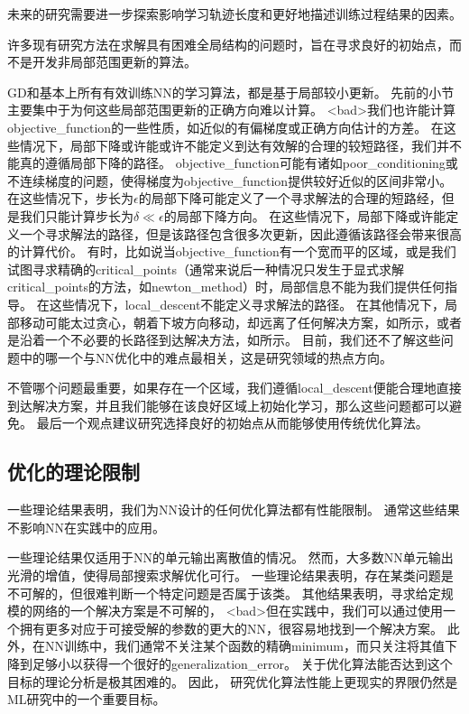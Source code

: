 未来的研究需要进一步探索影响学习轨迹长度和更好地描述训练过程结果的因素。

许多现有研究方法在求解具有困难全局结构的问题时，旨在寻求良好的初始点，而不是开发非局部范围更新的算法。


\gls{GD}和基本上所有有效训练\gls{NN}的学习算法，都是基于局部较小更新。
先前的小节主要集中于为何这些局部范围更新的正确方向难以计算。
<bad>我们也许能计算\gls{objective_function}的一些性质，如近似的有偏梯度或正确方向估计的方差。
在这些情况下，局部下降或许能或许不能定义到达有效解的合理的较短路径，我们并不能真的遵循局部下降的路径。
\gls{objective_function}可能有诸如\gls{poor_conditioning}或不连续梯度的问题，使得梯度为\gls{objective_function}提供较好近似的区间非常小。
在这些情况下，步长为$\epsilon$的局部下降可能定义了一个寻求解法的合理的短路经，但是我们只能计算步长为$\delta \ll \epsilon$的局部下降方向。
在这些情况下，局部下降或许能定义一个寻求解法的路径，但是该路径包含很多次更新，因此遵循该路径会带来很高的计算代价。
有时，比如说当\gls{objective_function}有一个宽而平的区域，或是我们试图寻求精确的\gls{critical_points}（通常来说后一种情况只发生于显式求解\gls{critical_points}的方法，如\gls{newton_method}）时，局部信息不能为我们提供任何指导。
在这些情况下，\gls{local_descent}不能定义寻求解法的路径。
在其他情况下，局部移动可能太过贪心，朝着下坡方向移动，却远离了任何解决方案，如所示，或者是沿着一个不必要的长路径到达解决方法，如所示。
目前，我们还不了解这些问题中的哪一个与\gls{NN}优化中的难点最相关，这是研究领域的热点方向。


不管哪个问题最重要，如果存在一个区域，我们遵循\gls{local_descent}便能合理地直接到达解决方案，并且我们能够在该良好区域上初始化学习，那么这些问题都可以避免。
最后一个观点建议研究选择良好的初始点从而能够使用传统优化算法。


\subsection{优化的理论限制}
\label{sec:theoretical_limits_of_optimization}
一些理论结果表明，我们为\gls{NN}设计的任何优化算法都有性能限制\citep{Blum92,JuddBook,wolpert96no}。
通常这些结果不影响\gls{NN}在实践中的应用。


一些理论结果仅适用于\gls{NN}的单元输出离散值的情况。
然而，大多数\gls{NN}单元输出光滑的增值，使得局部搜索求解优化可行。
一些理论结果表明，存在某类问题是不可解的，但很难判断一个特定问题是否属于该类。
其他结果表明，寻求给定规模的网络的一个解决方案是不可解的，
<bad>但在实践中，我们可以通过使用一个拥有更多对应于可接受解的参数的更大的\gls{NN}，很容易地找到一个解决方案。
此外，在\gls{NN}训练中，我们通常不关注某个函数的精确\gls{minimum}，而只关注将其值下降到足够小以获得一个很好的\gls{generalization_error}。
关于优化算法能否达到这个目标的理论分析是极其困难的。
因此， 研究优化算法性能上更现实的界限仍然是\gls{ML}研究中的一个重要目标。


